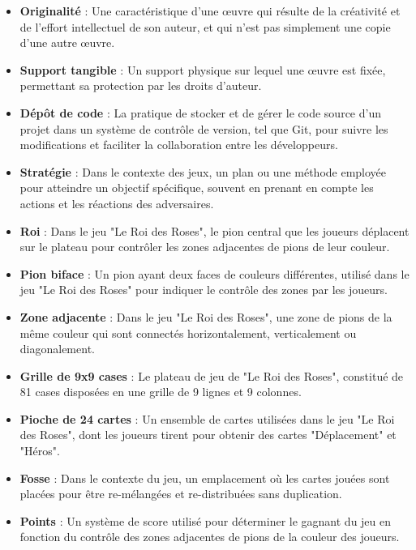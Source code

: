 \begin{itemize}
    \item \textbf{Originalité} : Une caractéristique d'une œuvre qui résulte de la créativité et de l'effort intellectuel de son auteur, et qui n'est pas simplement une copie d'une autre œuvre.

    \item \textbf{Support tangible} : Un support physique sur lequel une œuvre est fixée, permettant sa protection par les droits d'auteur.

    \item \textbf{Dépôt de code} : La pratique de stocker et de gérer le code source d'un projet dans un système de contrôle de version, tel que Git, pour suivre les modifications et faciliter la collaboration entre les développeurs.

    \item \textbf{Stratégie} : Dans le contexte des jeux, un plan ou une méthode employée pour atteindre un objectif spécifique, souvent en prenant en compte les actions et les réactions des adversaires.

    \item \textbf{Roi} : Dans le jeu "Le Roi des Roses", le pion central que les joueurs déplacent sur le plateau pour contrôler les zones adjacentes de pions de leur couleur.

    \item \textbf{Pion biface} : Un pion ayant deux faces de couleurs différentes, utilisé dans le jeu "Le Roi des Roses" pour indiquer le contrôle des zones par les joueurs.

    \item \textbf{Zone adjacente} : Dans le jeu "Le Roi des Roses", une zone de pions de la même couleur qui sont connectés horizontalement, verticalement ou diagonalement.

    \item \textbf{Grille de 9x9 cases} : Le plateau de jeu de "Le Roi des Roses", constitué de 81 cases disposées en une grille de 9 lignes et 9 colonnes.

    \item \textbf{Pioche de 24 cartes} : Un ensemble de cartes utilisées dans le jeu "Le Roi des Roses", dont les joueurs tirent pour obtenir des cartes "Déplacement" et "Héros".

    \item \textbf{Fosse} : Dans le contexte du jeu, un emplacement où les cartes jouées sont placées pour être re-mélangées et re-distribuées sans duplication.

    \item \textbf{Points} : Un système de score utilisé pour déterminer le gagnant du jeu en fonction du contrôle des zones adjacentes de pions de la couleur des joueurs.
\end{itemize}


